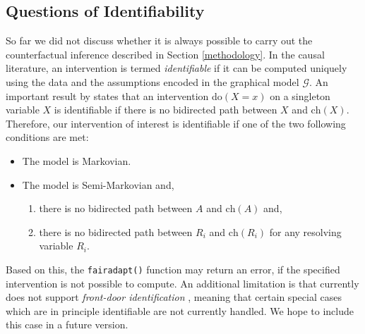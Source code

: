 \documentclass[
  nojss]{jss}
\providecommand{\tightlist}{%
  \setlength{\itemsep}{0pt}\setlength{\parskip}{0pt}}
\begin{document}
\hypertarget{questions-of-identifiability}{%
\subsection{Questions of
Identifiability}\label{questions-of-identifiability}}

So far we did not discuss whether it is always possible to carry out the
counterfactual inference described in Section \ref{methodology}. In the
causal literature, an intervention is termed \emph{identifiable} if it
can be computed uniquely using the data and the assumptions encoded in
the graphical model \(\mathcal{G}\). An important result by
\cite{tian2002general} states that an intervention do\((X = x)\) on a
singleton variable \(X\) is identifiable if there is no bidirected path
between \(X\) and \(\mathrm{ch}(X)\). Therefore, our intervention of
interest is identifiable if one of the two following conditions are met:

\begin{itemize}
\tightlist
\item
  The model is Markovian.
\item
  The model is Semi-Markovian and,

  \begin{enumerate}
  \def\labelenumi{(\roman{enumi})}
  \tightlist
  \item
    there is no bidirected path between \(A\) and \(\mathrm{ch}(A)\)
    and,
  \item
    there is no bidirected path between \(R_i\) and \(\mathrm{ch}(R_i)\)
    for any resolving variable \(R_i\).
  \end{enumerate}
\end{itemize}

Based on this, the \texttt{fairadapt()} function may return an error, if
the specified intervention is not possible to compute. An additional
limitation is that  currently does not support
\emph{front-door identification} \citep[Chapter~3]{pearl2009causality},
meaning that certain special cases which are in principle identifiable
are not currently handled. We hope to include this case in a future
version.


\end{document}
